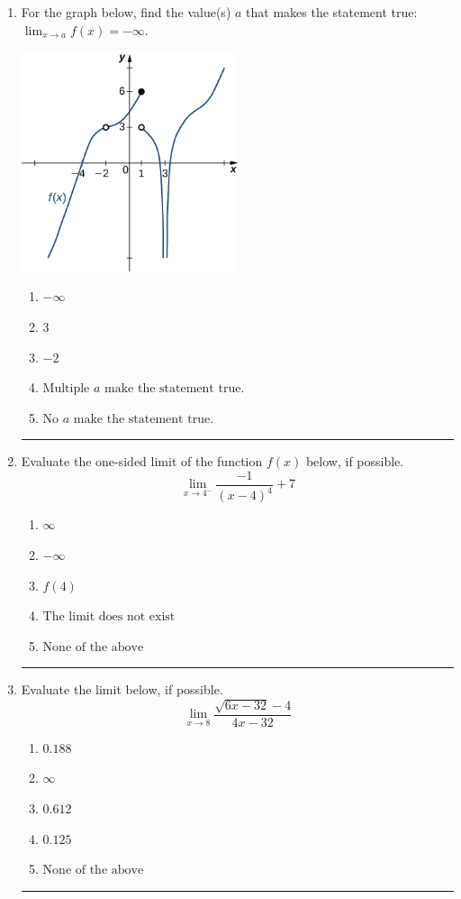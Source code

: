 \documentclass[14pt]{extbook}
\newcommand{\litem}[1]{\item#1\hspace*{-1cm}\rule{\textwidth}{0.4pt}}
\begin{document}
\begin{enumerate}
\litem{
For the graph below, find the value(s) $a$ that makes the statement true: $ \displaystyle \lim_{x \rightarrow a} f(x) = -\infty$.
\begin{center}
    \includegraphics[width=0.5\textwidth]{../Figures/evaluateLimitGraphicallyCopyB.png}
\end{center}
\begin{enumerate}[label=\Alph*.]
\item \( -\infty \)
\item \( 3 \)
\item \( -2 \)
\item \( \text{Multiple } a \text{ make the statement true}. \)
\item \( \text{No } a \text{ make the statement true}. \)

\end{enumerate} }
\litem{
Evaluate the one-sided limit of the function $f(x)$ below, if possible.\[ \lim_{x \rightarrow 4^-} \frac{-1}{(x-4)^4}+7 \]\begin{enumerate}[label=\Alph*.]
\item \( \infty \)
\item \( -\infty \)
\item \( f(4) \)
\item \( \text{The limit does not exist} \)
\item \( \text{None of the above} \)

\end{enumerate} }
\litem{
Evaluate the limit below, if possible.\[ \lim_{x \rightarrow 8} \frac{\sqrt{6x - 32} - 4}{4x - 32} \]\begin{enumerate}[label=\Alph*.]
\item \( 0.188 \)
\item \( \infty \)
\item \( 0.612 \)
\item \( 0.125 \)
\item \( \text{None of the above} \)


\end{enumerate}}
\end{enumerate}
\end{document}
